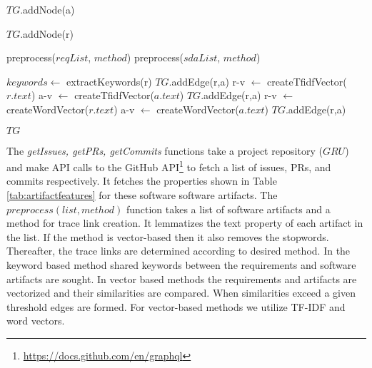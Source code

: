 \begin{breakablealgorithm}
\begin{algorithmic}[1]
 \label{algl:c}
\State $TG$.addNode(a)
\EndFor \label{algl:c}

 \label{algl:c}
\State $TG$.addNode(r)
\EndFor \label{algl:c}


\State preprocess($reqList$, $method$)
\State preprocess($sdaList$, $method$)

    \State $keywords \leftarrow$ extractKeywords(r)
        \State $TG$.addEdge(r,a)
    \EndIf
\EndCase
{}
    \State r-v $\leftarrow$ createTfidfVector($r.text$)
    \State a-v $\leftarrow$ createTfidfVector($a.text$)
      \State $TG$.addEdge(r,a)
    \EndIf
\EndCase
{}
    \State r-v $\leftarrow$ createWordVector($r.text$)
    \State a-v $\leftarrow$ createWordVector($a.text$)
        \State $TG$.addEdge(r,a)
    \EndIf
\EndCase
\EndSwitch
\EndFor
\EndFor

\Return $TG$
\end{algorithmic}

\end{breakablealgorithm}

The \textit{getIssues, getPRs, getCommits} functions take a project repository  ($GRU$) and make API calls to the GitHub API\footnote{\url{https://docs.github.com/en/graphql}} to fetch a list of issues, PRs, and commits respectively. 
It fetches the properties shown in Table \ref{tab:artifactfeatures} for these software software artifacts. 
The \textit{$preprocess(list, method)$}  function takes  a list of software artifacts and a method for trace link creation. 
It lemmatizes the text property of each artifact in the list. 
If the method is vector-based then it also removes the stopwords. 
Thereafter, the trace links are determined according to desired method.
In the keyword based method shared keywords between the requirements and software artifacts are sought. In vector based methods the requirements and artifacts are vectorized and their similarities are compared. When similarities exceed a given threshold edges are formed.
For vector-based methods we utilize TF-IDF and word vectors.



